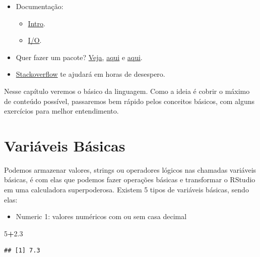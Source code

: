\documentclass[]{book}
\newenvironment{Shaded}{\begin{snugshade}}{\end{snugshade}}
\newcommand{\DecValTok}[1]{\textcolor[rgb]{0.00,0.00,0.81}{#1}}
\newcommand{\FloatTok}[1]{\textcolor[rgb]{0.00,0.00,0.81}{#1}}
\newcommand{\OperatorTok}[1]{\textcolor[rgb]{0.81,0.36,0.00}{\textbf{#1}}}
\providecommand{\tightlist}{%
  \setlength{\itemsep}{0pt}\setlength{\parskip}{0pt}}
\theoremstyle{definition}
\theoremstyle{definition}
\theoremstyle{definition}
\theoremstyle{remark}
\begin{document}
\begin{itemize}
\tightlist
\item
  Documentação:

  \begin{itemize}
  \tightlist
  \item
    \href{http://cran.r-project.org/doc/manuals/r-release/R-intro.html}{Intro}.
  \item
    \href{http://cran.r-project.org/doc/manuals/r-release/R-data.html}{I/O}.
  \end{itemize}
\item
  Quer fazer um pacote?
  \href{http://cran.r-project.org/doc/manuals/r-release/R-exts.html}{Veja},
  \href{http://cran.r-project.org/doc/manuals/r-release/R-ints.html}{aqui}
  e
  \href{http://cran.r-project.org/doc/manuals/r-release/R-lang.html}{aqui}.
\item
  \href{https://stackoverflow.com/questions/tagged/r}{Stackoverflow} te
  ajudará em horas de desespero.
\end{itemize}

Nesse capítulo veremos o básico da linguagem. Como a ideia é cobrir o
máximo de conteúdo possível, passaremos bem rápido pelos conceitos
básicos, com alguns exercícios para melhor entendimento.

\section{Variáveis Básicas}\label{variaveis-basicas}

Podemos armazenar valores, strings ou operadores lógicos nas chamadas
variáveis básicas, é com elas que podemos fazer operações básicas e
transformar o RStudio em uma calculadora superpoderosa. Existem 5 tipos
de variáveis básicas, sendo elas:

\begin{itemize}
\tightlist
\item
  Numeric 1: valores numéricos com ou sem casa decimal
\end{itemize}

\begin{Shaded}
\begin{Highlighting}[]
\DecValTok{5}\OperatorTok{+}\FloatTok{2.3}
\end{Highlighting}
\end{Shaded}

\begin{verbatim}
## [1] 7.3
\end{verbatim}
\end{document}
